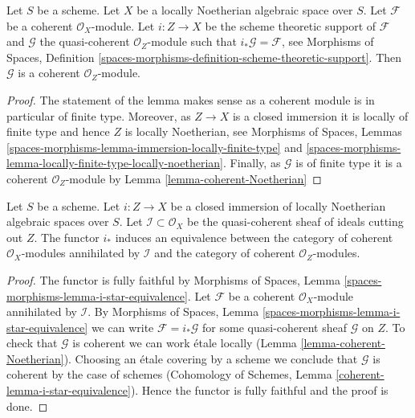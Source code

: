 \begin{lemma}
\label{lemma-coherent-support-closed}
Let $S$ be a scheme. Let $X$ be a locally Noetherian algebraic space over $S$.
Let $\mathcal{F}$ be a coherent $\mathcal{O}_X$-module. Let $i : Z \to X$
be the scheme theoretic support of $\mathcal{F}$ and $\mathcal{G}$
the quasi-coherent $\mathcal{O}_Z$-module such that
$i_*\mathcal{G} = \mathcal{F}$, see
Morphisms of Spaces, Definition
\ref{spaces-morphisms-definition-scheme-theoretic-support}.
Then $\mathcal{G}$ is a coherent $\mathcal{O}_Z$-module.
\end{lemma}

\begin{proof}
The statement of the lemma makes sense as a coherent module is in
particular of finite type. Moreover, as $Z \to X$ is a closed immersion
it is locally of finite type and hence $Z$ is locally Noetherian, see
Morphisms of Spaces, Lemmas
\ref{spaces-morphisms-lemma-immersion-locally-finite-type} and
\ref{spaces-morphisms-lemma-locally-finite-type-locally-noetherian}.
Finally, as $\mathcal{G}$ is of finite type it is a coherent
$\mathcal{O}_Z$-module by
Lemma \ref{lemma-coherent-Noetherian}
\end{proof}

\begin{lemma}
\label{lemma-i-star-equivalence}
Let $S$ be a scheme. Let $i : Z \to X$ be a closed immersion of locally
Noetherian algebraic spaces over $S$.
Let $\mathcal{I} \subset \mathcal{O}_X$ be the quasi-coherent sheaf of ideals
cutting out $Z$. The functor $i_*$ induces an equivalence between the
category of coherent $\mathcal{O}_X$-modules annihilated by $\mathcal{I}$
and the category of coherent $\mathcal{O}_Z$-modules.
\end{lemma}

\begin{proof}
The functor is fully faithful by
Morphisms of Spaces, Lemma \ref{spaces-morphisms-lemma-i-star-equivalence}.
Let $\mathcal{F}$ be a coherent $\mathcal{O}_X$-module
annihilated by $\mathcal{I}$. By
Morphisms of Spaces, Lemma \ref{spaces-morphisms-lemma-i-star-equivalence}
we can write $\mathcal{F} = i_*\mathcal{G}$ for some quasi-coherent
sheaf $\mathcal{G}$ on $Z$. To check that $\mathcal{G}$ is coherent
we can work \'etale locally (Lemma \ref{lemma-coherent-Noetherian}).
Choosing an \'etale covering by a scheme we conclude that
$\mathcal{G}$ is coherent by the case of schemes
(Cohomology of Schemes, Lemma \ref{coherent-lemma-i-star-equivalence}).
Hence the functor is fully faithful and the proof is done.
\end{proof}

